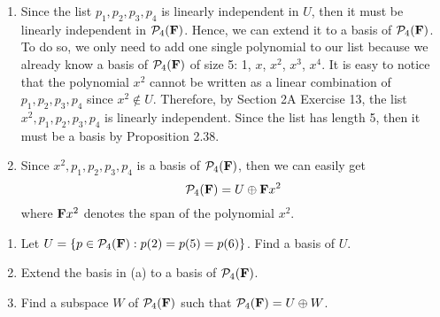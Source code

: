 \begin{solution}
\begin{enumerate}[label=(\alph*)]
        \item Since the list $p_1, p_2, p_3, p_4$ is linearly independent in $U$, then it must be linearly independent in $\mathcal{P}_4(\mathbf{F})$. Hence, we can extend it to a basis of $\mathcal{P}_4(\mathbf{F})$. To do so, we only need to add one single polynomial to our list because we already know a basis of $\mathcal{P}_4(\mathbf{F})$ of size 5: 1, $x$, $x^2$, $x^3$, $x^4$. It is easy to notice that the polynomial $x^2$ cannot be written as a linear combination of $p_1, p_2, p_3, p_4$ since $x^2 \notin U$. Therefore, by Section 2A Exercise 13, the list $x^2, p_1, p_2, p_3, p_4$ is linearly independent. Since the list has length 5, then it must be a basis by Proposition 2.38.
        \item Since $x^2, p_1, p_2, p_3, p_4$ is a basis of $\mathcal{P}_4(\mathbf{F})$, then we can easily get
        $$\mathcal{P}_4(\mathbf{F}) = U \oplus \mathbf{F} x^2$$
        where $\mathbf{F} x^2$ denotes the span of the polynomial $x^2$. \\
    \end{enumerate}
\end{solution}

\begin{exercise}
    \vspace*{-0.6cm}
    \begin{enumerate}[label=(\alph*)]
        \item Let $U = \{p \in \mathcal{P}_4(\mathbf{F}):p(2) = p(5) = p(6)\}$. Find a basis of $U$.
        \item Extend the basis in (a) to a basis of $\mathcal{P}_4(\mathbf{F})$.
        \item Find a subspace $W$ of $\mathcal{P}_4(\mathbf{F})$ such that $\mathcal{P}_4(\mathbf{F}) = U \oplus W$.\\
    \end{enumerate}
\end{exercise}

